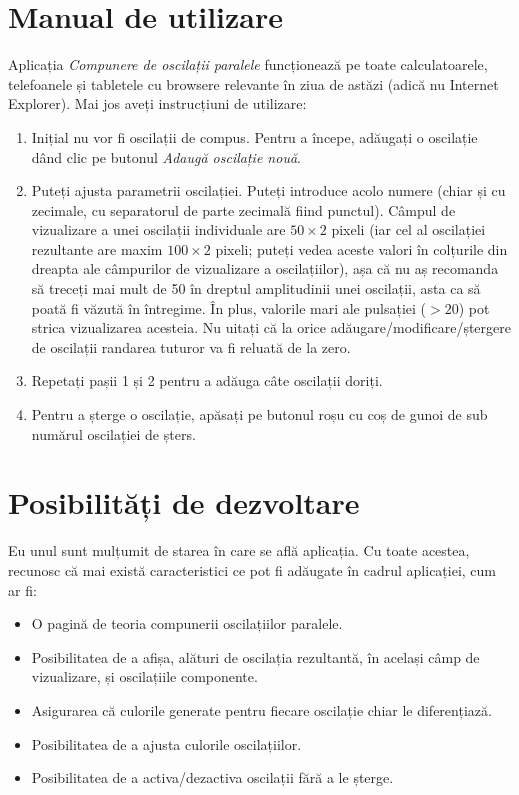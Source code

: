 \documentclass[numbers=endperiod]{scrreprt}
\newcommand{\ifig}[1]{
  \begin{figure}[h!]
    \fbox{\texttt{[image: \#1]}}
  \end{figure}
}
\begin{document}
\chapter{Manual de utilizare}
Aplicația \textit{Compunere de oscilații paralele} funcționează pe toate calculatoarele, telefoanele și tabletele cu browsere relevante în ziua de astăzi (adică nu Internet Explorer). Mai jos aveți instrucțiuni de utilizare:
\begin{enumerate}
  \item \ifig{initialAdd}
  Inițial nu vor fi oscilații de compus. Pentru a începe, adăugați o oscilație dând clic pe butonul \textit{Adaugă oscilație nouă}.
  \item \ifig{primoscAdd}
  Puteți ajusta parametrii oscilației. Puteți introduce acolo numere (chiar și cu zecimale, cu separatorul de parte zecimală fiind punctul). Câmpul de vizualizare a unei oscilații individuale are $50\times 2$ pixeli (iar cel al oscilației rezultante are maxim $100\times 2$ pixeli; puteți vedea aceste valori în colțurile din dreapta ale câmpurilor de vizualizare a oscilațiilor), așa că nu aș recomanda să treceți mai mult de 50 în dreptul amplitudinii unei oscilații, asta ca să poată fi văzută în întregime. În plus, valorile mari ale pulsației ($>20$) pot strica vizualizarea acesteia. Nu uitați că la orice adăugare/modificare/ștergere de oscilații randarea tuturor va fi reluată de la zero.
  \item \ifig{primoscNew}
  Repetați pașii 1 și 2 pentru a adăuga câte oscilații doriți.
  \item \ifig{triosc}
  Pentru a șterge o oscilație, apăsați pe butonul roșu cu coș de gunoi de sub numărul oscilației de șters.
\end{enumerate}
\chapter{Posibilități de dezvoltare}
Eu unul sunt mulțumit de starea în care se află aplicația. Cu toate acestea, recunosc că mai există caracteristici ce pot fi adăugate în cadrul aplicației, cum ar fi:
\begin{itemize}
  \item O pagină de teoria compunerii oscilațiilor paralele.
  \item Posibilitatea de a afișa, alături de oscilația rezultantă, în același câmp de vizualizare, și oscilațiile componente.
  \item Asigurarea că culorile generate pentru fiecare oscilație chiar le diferențiază.
  \item Posibilitatea de a ajusta culorile oscilațiilor.
  \item Posibilitatea de a activa/dezactiva oscilații fără a le șterge.
\end{itemize}
\end{document}
